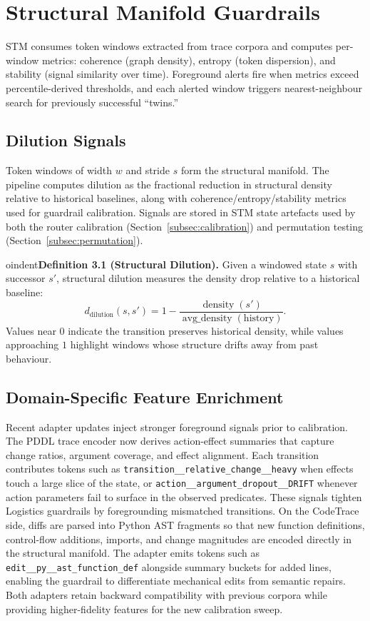 \documentclass[11pt]{article}
\begin{document}
\section{Structural Manifold Guardrails}
STM consumes token windows extracted from trace corpora and computes per-window
metrics: coherence (graph density), entropy (token dispersion), and stability
(signal similarity over time). Foreground alerts fire when metrics exceed
percentile-derived thresholds, and each alerted window triggers nearest-neighbour
search for previously successful ``twins.''

\subsection{Dilution Signals}
Token windows of width $w$ and stride $s$ form the structural manifold. The
pipeline computes dilution as the fractional reduction in structural density
relative to historical baselines, along with coherence/entropy/stability metrics
used for guardrail calibration. Signals are stored in STM state artefacts used by
both the router calibration (Section~\ref{subsec:calibration}) and permutation
testing (Section~\ref{subsec:permutation}).


oindent\textbf{Definition 3.1 (Structural Dilution).} Given a windowed state
$s$ with successor $s'$, structural dilution measures the density drop relative to a
historical baseline:
\begin{equation*}
  d_{\text{dilution}}(s,s') = 1 - \frac{\operatorname{density}(s')}{\operatorname{avg\_density}(\text{history})}.
\end{equation*}
Values near $0$ indicate the transition preserves historical density, while
values approaching $1$ highlight windows whose structure drifts away from past
behaviour.

\subsection{Domain-Specific Feature Enrichment}
Recent adapter updates inject stronger foreground signals prior to calibration.
The PDDL trace encoder now derives action-effect summaries that capture change
ratios, argument coverage, and effect alignment. Each transition contributes
tokens such as \texttt{transition\_\_relative\_change\_\_heavy} when effects
touch a large slice of the state, or \texttt{action\_\_argument\_dropout\_\_DRIFT}
whenever action parameters fail to surface in the observed predicates. These
signals tighten Logistics guardrails by foregrounding mismatched transitions.
On the CodeTrace side, diffs are parsed into Python AST fragments so that new
function definitions, control-flow additions, imports, and change magnitudes are
encoded directly in the structural manifold. The adapter emits tokens such as
\texttt{edit\_\_py\_\_ast\_function\_def} alongside summary buckets for added
lines, enabling the guardrail to differentiate mechanical edits from semantic
repairs. Both adapters retain backward compatibility with previous corpora
while providing higher-fidelity features for the new calibration sweep.
\end{document}
